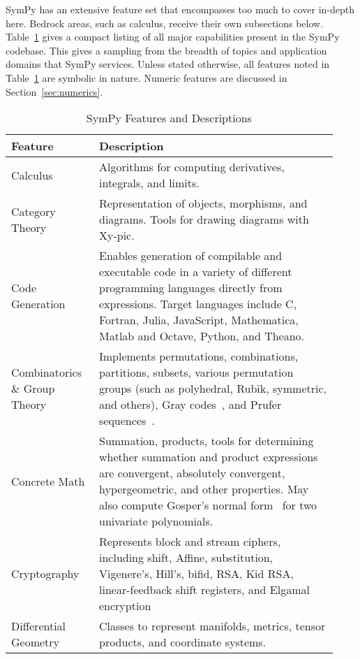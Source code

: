 
SymPy has an extensive feature set that encompasses too much to cover in-depth
here. Bedrock areas, such as calculus, receive their own subsections below.
Table~\ref{features-table} gives a compact listing of all major capabilities
present in the SymPy codebase. This gives a sampling from the breadth of
topics and application domains that SymPy services. Unless stated otherwise,
all features noted in Table~\ref{features-table} are symbolic in nature.
Numeric features are discussed in Section~\ref{sec:numerics}.


\begin{longtable}[htbc]{p{0.25\linewidth}p{0.68\linewidth}}
\caption{SymPy Features and Descriptions\label{features-table}}\\
\toprule
\textbf{Feature} & \textbf{Description} \\
\midrule
Calculus & Algorithms for computing derivatives, integrals, and limits.\\

Category Theory & Representation of objects, morphisms, and diagrams. Tools
for drawing diagrams with Xy-pic.\\

Code Generation & Enables generation of compilable and executable code in a
variety of different programming languages directly from expressions. Target
languages include C, Fortran, Julia, JavaScript,
Mathematica, Matlab and Octave, Python, and Theano.\\

Combinatorics \& Group Theory & Implements permutations, combinations,
partitions, subsets, various permutation groups (such as polyhedral, Rubik,
symmetric, and others), Gray codes~\cite{Nijenhuis1978combinatorial},
and Prufer sequences~\cite{biggs1976graph}.\\

Concrete Math & Summation, products, tools for determining whether summation
and product expressions are convergent, absolutely convergent, hypergeometric,
and
other properties. May also compute Gosper's normal form~\cite{petkovvsek1996bak} for two univariate polynomials.\\

Cryptography & Represents block and stream ciphers, including shift, Affine,
substitution, Vigenere's, Hill's, bifid, RSA, Kid RSA,
linear-feedback shift registers, and Elgamal encryption\\

Differential Geometry & Classes to represent manifolds, metrics, tensor
products, and coordinate systems.\\


\end{longtable}
